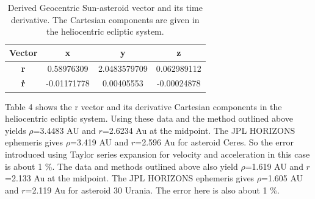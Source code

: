 \documentclass[letterpaper,12pt]{article}
\begin{document}
\FloatBarrier
\begin{table}[h!]
\caption{Derived Geocentric Sun-asteroid vector and its time derivative. The Cartesian components are given in the heliocentric ecliptic system.} %
\centering %
\begin{tabular}{| c | c | c | c |} %
\hline %
Vector & x & y & z \\ [0.5ex] %
\hline %
{\bf r}  & 0.58976309  &  2.0483579709 &  0.062989112\\ \hline
\begin{math} {\bf \dot{r}} \end{math} & -0.01171778  &  0.00405553 &  -0.00024878 \\  [1ex] %
\hline %
\end{tabular}
\label{table:nonlin} %
\end{table}
\FloatBarrier

Table 4 shows the r vector and its derivative Cartesian components in the heliocentric ecliptic system.
Using these data and the method outlined above yields \begin{math} \rho \end{math}=3.4483 AU and \begin{math} r \end{math}=2.6234 Au at the midpoint. The JPL HORIZONS ephemeris gives \begin{math} \rho \end{math}=3.419 AU and \begin{math} r \end{math}=2.596 Au for asteroid Ceres. So the error introduced using Taylor series expansion for velocity and acceleration in this case is about 1 \%. The data and methods outlined above also yield \begin{math} \rho \end{math}=1.619 AU and \begin{math} r \end{math}=2.133 Au at the midpoint. The JPL HORIZONS ephemeris gives \begin{math} \rho \end{math}=1.605 AU and \begin{math} r \end{math}=2.119 Au for asteroid 30 Urania. The error here is also about 1 \%.
\end{document}
